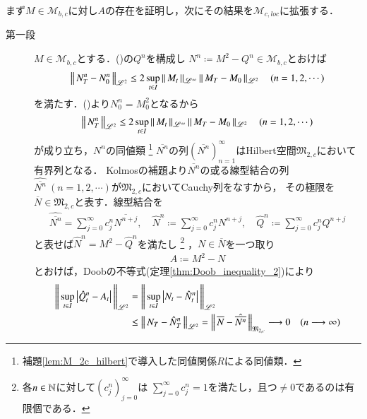 	\begin{prf}
		まず$M \in \mathcal{M}_{b,c}$に対し$A$の存在を証明し，次にその結果を$\mathcal{M}_{c,loc}$に拡張する．
		\begin{description}
			\item[第一段]
				$M \in \mathcal{M}_{b,c}$とする．()の$Q^n$を構成し
				$N^n \coloneqq M^2 - Q^n \in \mathcal{M}_{b,c}$とおけば
				\begin{align}
					\left\|\, N_T^n - N_0^n\, \right\|_{\mathscr{L}^2} \leq 2 \operatorname*{sup}_{t \in I} \left\|\, M_t\, \right\|_{\mathscr{L}^\infty} \left\|\, M_T - M_0\, \right\|_{\mathscr{L}^2} \quad (n=1,2,\cdots)
				\end{align}
				を満たす．()より$N_0^n = M^2_0$となるから
				\begin{align}
					\left\|\, N_T^n\, \right\|_{\mathscr{L}^2} 
					\leq 2 \operatorname*{sup}_{t \in I} \left\|\, M_t\, \right\|_{\mathscr{L}^\infty} \left\|\, M_T - M_0\, \right\|_{\mathscr{L}^2} \quad (n=1,2,\cdots)
				\end{align}
				が成り立ち，$N^n$の同値類
				\footnote{
					補題\ref{lem:M_2c_hilbert}で導入した同値関係$R$による同値類．
				}
				$\overline{N^n}$の列$(\overline{N^n})_{n=1}^{\infty}$はHilbert空間$\mathfrak{M}_{2,c}$において有界列となる．
				Kolmosの補題より$\overline{N^n}$の或る線型結合の列$\hat{\overline{N^n}}\ (n=1,2,\cdots)$が$\mathfrak{M}_{2,c}$においてCauchy列をなすから，
				その極限を$\overline{N} \in \mathfrak{M}_{2,c}$と表す．線型結合を
				\begin{align}
					\hat{\overline{N^n}} = \sum_{j=0}^{\infty} c^n_j \overline{N^{n+j}}, \quad
					\hat{N}^n \coloneqq \sum_{j=0}^{\infty} c^n_j N^{n+j}, \quad
					\hat{Q}^n \coloneqq \sum_{j=0}^{\infty} c^n_j Q^{n+j}
				\end{align}
				と表せば$\hat{N}^n = M^2 - \hat{Q}^n$を満たし
				\footnote{
					各$n \in \mathbb{N}$に対して$(c^n_j)_{j=0}^{\infty}$は
					$\sum_{j=0}^{\infty} c^n_j = 1$を満たし，且つ$\neq 0$であるのは有限個である．
				}
				，$N \in \overline{N}$を一つ取り
				\begin{align}
					A \coloneqq M^2 - N \label{eq:thm_quadratic_variation_0}
				\end{align}
				とおけば，Doobの不等式(定理\ref{thm:Doob_inequality_2})により
				\begin{align}
					\Norm{\sup{t \in I}{\left| \hat{Q}_t^n - A_t \right|}}{\mathscr{L}^2}
					&= \Norm{\sup{t \in I}{\left| N_t - \hat{N}_t^n \right|}}{\mathscr{L}^2} \\
					&\leq \Norm{N_T - \hat{N}_T^n}{\mathscr{L}^2}
					= \Norm{\overline{N} - \hat{\overline{N^n}}}{\mathfrak{M}_{2,c}} \longrightarrow 0 \quad (n \longrightarrow \infty) 

\end{align}
\end{description}
\end{prf}

